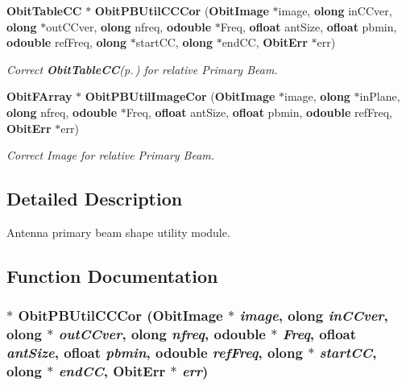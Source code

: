 \begin{CompactItemize}
{\bf Obit\-Table\-CC} $\ast$ {\bf Obit\-PBUtil\-CCCor} ({\bf Obit\-Image} $\ast$image, {\bf olong} in\-CCver, {\bf olong} $\ast$out\-CCver, {\bf olong} nfreq, {\bf odouble} $\ast$Freq, {\bf ofloat} ant\-Size, {\bf ofloat} pbmin, {\bf odouble} ref\-Freq, {\bf olong} $\ast$start\-CC, {\bf olong} $\ast$end\-CC, {\bf Obit\-Err} $\ast$err)
\begin{CompactList}\small\item\em Correct {\bf Obit\-Table\-CC}{\rm (p.\,\pageref{structObitTableCC})} for relative Primary Beam. \item\end{CompactList}\item 
{\bf Obit\-FArray} $\ast$ {\bf Obit\-PBUtil\-Image\-Cor} ({\bf Obit\-Image} $\ast$image, {\bf olong} $\ast$in\-Plane, {\bf olong} nfreq, {\bf odouble} $\ast$Freq, {\bf ofloat} ant\-Size, {\bf ofloat} pbmin, {\bf odouble} ref\-Freq, {\bf Obit\-Err} $\ast$err)
\begin{CompactList}\small\item\em Correct Image for relative Primary Beam. \item\end{CompactList}\end{CompactItemize}


\subsection{Detailed Description}
Antenna primary beam shape utility module. 



\subsection{Function Documentation}
\subsubsection{$\ast$ Obit\-PBUtil\-CCCor ({\bf Obit\-Image} $\ast$ {\em image}, {\bf olong} {\em in\-CCver}, {\bf olong} $\ast$ {\em out\-CCver}, {\bf olong} {\em nfreq}, {\bf odouble} $\ast$ {\em Freq}, {\bf ofloat} {\em ant\-Size}, {\bf ofloat} {\em pbmin}, {\bf odouble} {\em ref\-Freq}, {\bf olong} $\ast$ {\em start\-CC}, {\bf olong} $\ast$ {\em end\-CC}, {\bf Obit\-Err} $\ast$ {\em err})}\label{ObitPBUtil_8h_a4}


